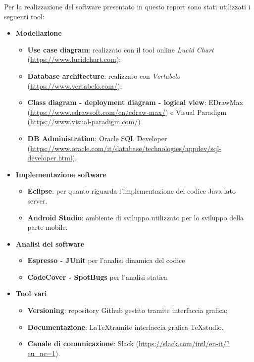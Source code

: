 Per la realizzazione del software presentato in questo report sono stati utilizzati i seguenti tool:
\begin{itemize}
	\item \textbf{Modellazione}
	\begin{itemize}
		\item \textbf{Use case diagram}: realizzato con il tool online \textit{Lucid Chart} (\href{https://www.lucidchart.com}{https://www.lucidchart.com});
		\item \textbf{Database architecture}: realizzato con \textit{Vertabelo} (\href{https://www.vertabelo.com/}{https://www.vertabelo.com/});
		\item \textbf{Class diagram - deployment diagram - logical view}: EDrawMax (\href{https://www.edrawsoft.com/en/edraw-max/}{https://www.edrawsoft.com/en/edraw-max/}) e Visual Paradigm (\href{https://www.visual-paradigm.com/}{https://www.visual-paradigm.com/})
		\item \textbf{DB Administration}: Oracle SQL Developer (\href{https://www.oracle.com/it/database/technologies/appdev/sql-developer.html}{https://www.oracle.com/it/database/technologies/appdev/sql-developer.html}).
	\end{itemize}
	\item \textbf{Implementazione software}
	\begin{itemize}
		\item \textbf{Eclipse}: per quanto riguarda l'implementazione del codice Java lato server.
		\item \textbf{Android Studio}: ambiente di sviluppo utilizzato per lo sviluppo della parte mobile.
	\end{itemize}
	
	\item \textbf{Analisi del software}
	\begin{itemize}
		\item \textbf{Espresso - JUnit} per l'analisi dinamica del codice
		\item \textbf{CodeCover - SpotBugs} per l'analisi statica
	\end{itemize}
	\item \textbf{Tool vari}
	\begin{itemize}
		\item \textbf{Versioning}: repository Github gestito tramite interfaccia grafica;
		\item \textbf{Documentazione}: \LaTeX  tramite interfaccia grafica TeXstudio.
		\item \textbf{Canale di comunicazione}: Slack (\href{https://slack.com/intl/en-it/?eu\_nc=1}{https://slack.com/intl/en-it/?eu\_nc=1}).
	\end{itemize}
\end{itemize}